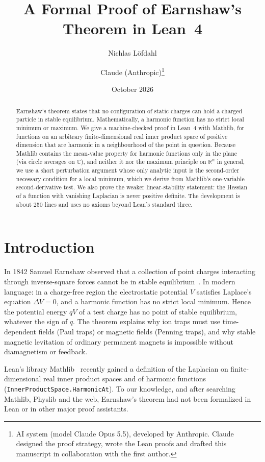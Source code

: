 \documentclass[11pt]{article}
\title{A Formal Proof of Earnshaw's Theorem in Lean~4}
\author{Nichlas Löfdahl \and Claude (Anthropic)\thanks{AI system (model Claude Opus 5.5), developed by Anthropic.
Claude designed the proof strategy, wrote the Lean proofs and drafted this manuscript in collaboration with
the first author.}}
\date{October 2026}
\theoremstyle{remark}
\begin{document}
\sloppy
\maketitle

\begin{abstract}
Earnshaw's theorem states that no configuration of static charges can hold a charged particle in
stable equilibrium. Mathematically, a harmonic function has no strict local minimum or maximum. We
give a machine-checked proof in Lean~4 with Mathlib, for functions on an arbitrary
finite-dimensional real inner product space of positive dimension that are harmonic in a
neighbourhood of the point in question. Because Mathlib contains the mean-value property for
harmonic functions only in the plane (via circle averages on $\mathbb{C}$), and neither it nor the
maximum principle on $\mathbb{R}^n$ in general, we use a short
perturbation argument whose only analytic input is the second-order necessary condition for a
local minimum, which we derive from Mathlib's one-variable second-derivative test. We also prove
the weaker linear-stability statement: the Hessian of a function with vanishing Laplacian is never
positive definite. The development is about 250 lines and uses no axioms beyond Lean's standard
three.
\end{abstract}

\section{Introduction}

In 1842 Samuel Earnshaw observed that a collection of point charges interacting through
inverse-square forces cannot be in stable equilibrium~\cite{earnshaw1842}. In modern language: in
a charge-free region the electrostatic potential $V$ satisfies Laplace's equation $\Delta V=0$, and
a harmonic function has no strict local minimum. Hence the potential energy $qV$ of a test charge
has no point of stable equilibrium, whatever the sign of $q$. The theorem explains why ion traps
must use time-dependent fields (Paul traps) or magnetic fields (Penning traps), and why stable
magnetic levitation of ordinary permanent magnets is impossible without diamagnetism or feedback.

Lean's library Mathlib~\cite{mathlib2020} recently gained a definition of the Laplacian on
finite-dimensional real inner product spaces and of harmonic functions
(\texttt{InnerProductSpace.HarmonicAt}). To our knowledge, and after searching Mathlib, Physlib
and the web, Earnshaw's theorem had not been formalized in Lean or in other major proof assistants.
\end{document}
